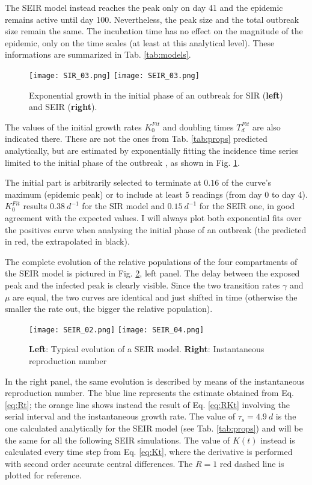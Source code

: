 \documentclass[DIV=12, BCOR=0pt]{scrartcl}  %
\begin{document}
	The SEIR model instead reaches the peak only on day 41 and the epidemic remains active until day 100. Nevertheless, the peak size and the total outbreak size remain the same. The incubation time has no effect on the magnitude of the epidemic, only on the time scales (at least at this analytical level). These informations are summarized in Tab. \ref{tab:models}. 
	\begin{figure}[h!]
		\centering
		\texttt{[image: SIR\_03.png]}
		\texttt{[image: SEIR\_03.png]}
		\caption{Exponential growth in the initial phase of an outbreak for SIR (\textbf{left}) and SEIR (\textbf{right}). }
		\label{fig:BothExp}
	\end{figure}

	The values of the initial growth rates $K_0^{Fit}$ and doubling times $T_d^{Fit}$ are also indicated there. These are not the ones from Tab. \ref{tab:props} predicted analytically, but are estimated by exponentially fitting the incidence time series limited to the initial phase of the outbreak \citep{Bauch2005}, as shown in Fig. \ref{fig:BothExp}.
	 
	The initial part is arbitrarily selected to terminate at $0.16$ of the curve's maximum (epidemic peak) or to include at least 5 readings (from day 0 to day 4). 
	$K_0^{Fit}$ results $0.38 \ d^{-1}$ for the SIR model and  $0.15 \ d^{-1}$ for the SEIR one, in good agreement with the expected values. I will always plot both exponential fits over the positives curve when analysing the initial phase of an outbreak (the predicted in red, the extrapolated in black). 
	
	
	The complete evolution of the relative populations of the four compartments of the SEIR model is pictured in Fig. \ref{fig:SEIRboth}, left panel. The delay between the exposed peak and the infected peak is clearly visible. Since the two transition rates $\gamma$ and $\mu$ are equal, the two curves are identical and just shifted in time (otherwise the smaller the rate out, the bigger the relative population).
	\begin{figure}[h]
		\centering
		\texttt{[image: SEIR\_02.png]}
		\texttt{[image: SEIR\_04.png]}
		\caption{\textbf{Left}: Typical evolution of a SEIR model. \textbf{Right}: Instantaneous reproduction number }
		\label{fig:SEIRboth}
	\end{figure}

	In the right panel, the same evolution is described by means of the instantaneous reproduction number. The blue line represents the estimate obtained from Eq. \ref{eq:Rt}; the orange line shows instead the result of Eq. \ref{eq:RKt} involving the serial interval and the instantaneous growth rate.  The value of $\tau_s = 4.9 \ d$ is the one calculated analytically for the SEIR model (see Tab. \ref{tab:props}) and will be the same for all the following SEIR simulations.
	The value of $K(t)$ instead is calculated every time step from Eq. \ref{eq:Kt}, where the derivative is performed with second order accurate central differences. The $R = 1$ red dashed line is plotted for reference.
\end{document}
